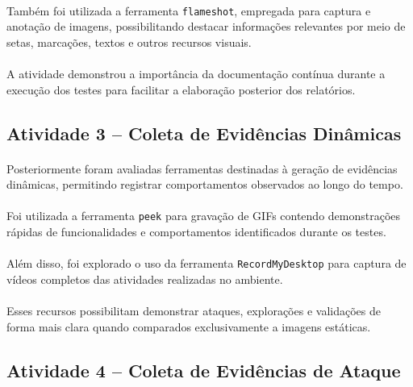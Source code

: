 \paragraph{}
Também foi utilizada a ferramenta \texttt{flameshot}, empregada para captura e
anotação de imagens, possibilitando destacar informações relevantes por meio de
setas, marcações, textos e outros recursos visuais.

\paragraph{}
A atividade demonstrou a importância da documentação contínua durante a
execução dos testes para facilitar a elaboração posterior dos relatórios.

\subsection{Atividade 3 -- Coleta de Evidências Dinâmicas}

\paragraph{}
Posteriormente foram avaliadas ferramentas destinadas à geração de evidências
dinâmicas, permitindo registrar comportamentos observados ao longo do tempo.

\paragraph{}
Foi utilizada a ferramenta \texttt{peek} para gravação de GIFs contendo
demonstrações rápidas de funcionalidades e comportamentos identificados durante
os testes.

\paragraph{}
Além disso, foi explorado o uso da ferramenta \texttt{RecordMyDesktop} para
captura de vídeos completos das atividades realizadas no ambiente.

\paragraph{}
Esses recursos possibilitam demonstrar ataques, explorações e validações de
forma mais clara quando comparados exclusivamente a imagens estáticas.

\subsection{Atividade 4 -- Coleta de Evidências de Ataque}


